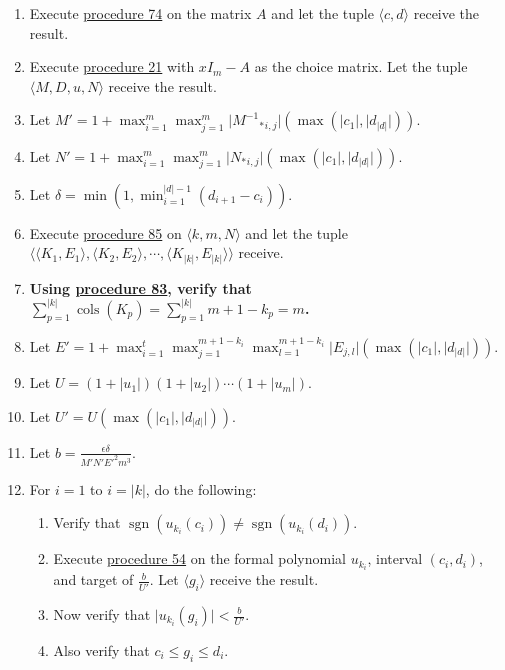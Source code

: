 \documentclass[twocolumn]{article}
\DeclareMathOperator{\sgn}{sgn}
\DeclareMathOperator{\cols}{cols}
\begin{document}
				\begin{enumerate}
					\item Execute \hyperref[sec:procedure 74]{procedure 74} on the matrix $A$ and let the tuple $\langle c,d\rangle$ receive the result.
					\item Execute \hyperref[sec:procedure 21]{procedure 21} with $xI_m-A$ as the choice matrix. Let the tuple $\langle M,D,u,N\rangle$ receive the result.
					\item Let $M'=1+\max_{i=1}^m\max_{j=1}^m\lvert {{M^{-1}}_*}_{i,j}\rvert(\max(\lvert c_1\rvert,\lvert d_{\lvert d\rvert}\rvert))$.
					\item Let $N'=1+\max_{i=1}^m\max_{j=1}^m\lvert {N_*}_{i,j}\rvert(\max(\lvert c_1\rvert,\lvert d_{\lvert d\rvert}\rvert))$.
					\item Let $\delta=\min(1,\min_{i=1}^{\lvert d\rvert-1}(d_{i+1}-c_i))$.
					\item Execute \hyperref[sec:procedure 85]{procedure 85} on $\langle k,m,N\rangle$ and let the tuple $\langle\langle K_1,E_1\rangle,\langle K_2,E_2\rangle,\cdots,\langle K_{\lvert k\rvert},E_{\lvert k\rvert}\rangle\rangle$ receive.
					\item \textbf{Using \hyperref[sec:procedure 83]{procedure 83}, verify that $\sum_{p=1}^{\lvert k\rvert}\cols(K_p)=\sum_{p=1}^{\lvert k\rvert} m+1-k_p=m$.}
					\item Let $E'=1+\max_{i=1}^t\max_{j=1}^{m+1-k_i}\max_{l=1}^{m+1-k_i}\lvert E_{j,l}\rvert(\max(\lvert c_1\rvert,\lvert d_{\lvert d\rvert}\rvert))$.
					\item Let $U=(1+\lvert u_1\rvert)(1+\lvert u_2\rvert)\cdots(1+\lvert u_m\rvert)$.
					\item Let $U'=U(\max(\lvert c_1\rvert,\lvert d_{\lvert d\rvert}\rvert))$.
					\item Let $b=\frac{\epsilon\delta}{M'N'E'^2m^3}$.
					\item For $i=1$ to $i=\lvert k\rvert$, do the following:
					\begin{enumerate}
						\item Verify that $\sgn(u_{k_i}(c_i))\ne\sgn(u_{k_i}(d_i))$.
						\item Execute \hyperref[sec:procedure 54]{procedure 54} on the formal polynomial $u_{k_i}$, interval $(c_i, d_i)$, and target of $\frac{b}{U'}$. Let $\langle g_i\rangle$ receive the result.
						\item Now verify that $\lvert u_{k_i}(g_i)\rvert<\frac{b}{U'}$.
						\item Also verify that $c_i\le g_i\le d_i$.

\end{enumerate}
\end{enumerate}
\end{document}
